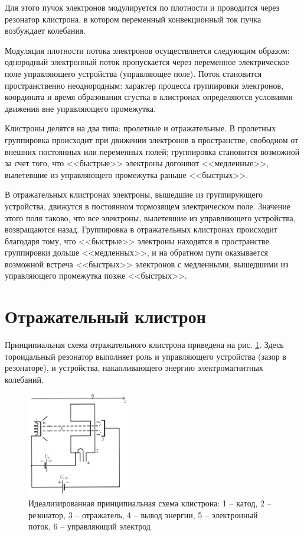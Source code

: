 \documentclass[a4paper,14pt]{extarticle}
\begin{document}
Для этого пучок электронов модулируется по плотности и проводится че­рез резонатор клистрона, в котором переменный конвекционный ток пучка возбуждает колебания.

Модуляция плотности потока электронов осуществляется следующим образом: однородный электронный по­ток пропускается через переменное электрическое поле управляющего устройства (управляющее поле). Поток становится пространственно неоднородным: характер процесса группировки электронов, координата и время образования сгустка в клистронах определяются условиями движения вне управляющего промежутка.

Клистроны делятся на два типа: пролетные и отражательные. В пролетных группировка происходит при движении электронов в пространстве, свободном от внешних постоянных или переменных полей; группировка становится возможной за счет того, что <<быстрые>> электроны догоняют <<медленные>>, вылетевшие из управляюще­го промежутка раньше <<быстрых>>.

В отражательных клистронах электроны, вышедшие из группирующего устройства, движутся в постоянном тормозящем электрическом поле. Значение этого поля таково, что все электроны, вылетевшие из управляющего устройства, возвращаются назад. Группировка в отражательных клистронах происходит благодаря тому, что <<быстрые>> электроны находятся в пространстве группировки дольше <<медленных>>, и на обратном пути оказывается возможной встреча <<быстрых>> электронов с медленными, вышедшими из управляющего промежутка позже <<быстрых>>.

\newpage

\section{Отражательный клистрон}

Принципиальная схема отражательного клистрона приведена на рис. \ref{fig:1}. Здесь тороидальный резонатор выполняет роль и управляющего устройства (зазор в резонаторе), и устройства, накапливающего энергию электромагнитных колебаний.

\begin{figure}[H]
  \centering
  \includegraphics[width=0.4\textwidth]{fig/fig1}
  \caption{Идеализированная принципиальная схема клистрона: 1 -- катод, 2 -- резонатор, 3 -- отражатель, 4 -- вывод энергии, 5 -- электронный поток, 6 -- управляющий электрод}
  \label{fig:1}
\end{figure}
\end{document}
